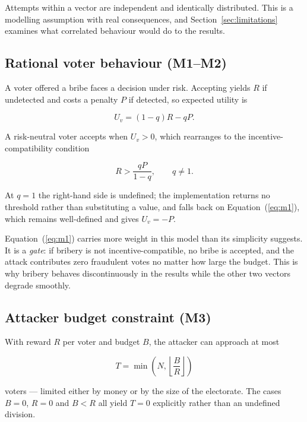 \documentclass[11pt,a4paper]{article}
\newcommand{\Uv}{U_{v}}
\newcommand{\eqnref}[1]{Equation~(\ref{#1})}
\begin{document}
Attempts within a vector are independent and identically distributed. This is a
modelling assumption with real consequences, and Section~\ref{sec:limitations} examines
what correlated behaviour would do to the results.

\subsection{Rational voter behaviour (M1--M2)}

A voter offered a bribe faces a decision under risk. Accepting yields $R$ if undetected
and costs a penalty $P$ if detected, so expected utility is

\begin{equation}
\Uv = (1 - q) R - q P .
\label{eq:m1}
\end{equation}

A risk-neutral voter accepts when $\Uv > 0$, which rearranges to the
incentive-compatibility condition

\begin{equation}
R > \frac{qP}{1 - q}, \qquad q \neq 1 .
\label{eq:m2}
\end{equation}

At $q = 1$ the right-hand side is undefined; the implementation returns no threshold
rather than substituting a value, and falls back on \eqnref{eq:m1}, which remains
well-defined and gives $\Uv = -P$.

\eqnref{eq:m1} carries more weight in this model than its simplicity suggests. It is a
\emph{gate}: if bribery is not incentive-compatible, no bribe is accepted, and the
attack contributes zero fraudulent votes no matter how large the budget. This is why
bribery behaves discontinuously in the results while the other two vectors degrade
smoothly.

\subsection{Attacker budget constraint (M3)}

With reward $R$ per voter and budget $B$, the attacker can approach at most

\begin{equation}
T = \min\!\left(N, \left\lfloor \frac{B}{R} \right\rfloor\right)
\label{eq:m3}
\end{equation}

voters --- limited either by money or by the size of the electorate. The cases $B = 0$,
$R = 0$ and $B < R$ all yield $T = 0$ explicitly rather than an undefined division.
\end{document}

